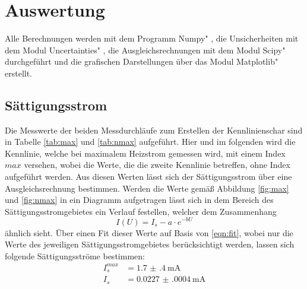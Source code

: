 \section{Auswertung}
\label{sec:Auswertung}
Alle Berechnungen werden mit dem Programm \glqq Numpy" \cite{numpy}, die Unsicherheiten mit dem Modul \glqq Uncertainties" \cite{uncertainties}, die Ausgleichsrechnungen mit dem Modul \glqq Scipy" \cite{scipy} durchgeführt und die grafischen Darstellungen über das Modul \glqq Matplotlib" \cite{matplotlib} erstellt.


\subsection{Sättigungsstrom}
\label{sub:Sättigungsstrom}

Die Messwerte der beiden Messdurchläufe zum Erstellen der Kennlinienschar sind in Tabelle \ref{tab:max} und \ref{tab:nmax} aufgeführt. Hier und im folgenden wird die Kennlinie, welche bei maximalem Heizstrom gemessen wird, mit einem Index $max$ versehen, wobei die Werte, die die zweite Kennlinie betreffen, ohne Index aufgeführt werden. Aus diesen Werten lässt sich der Sättigungsstrom über eine Ausgleichsrechnung bestimmen. Werden die Werte gemäß Abbildung \ref{fig:max} und \ref{fig:nmax} in ein Diagramm aufgetragen lässt sich in dem Bereich des Sättigungsstromgebietes ein Verlauf festellen, welcher dem Zusammenhang
\begin{equation}
    I(U)=I_s-a\cdot e^{-bU}
    \label{eqn:fit}
\end{equation}
ähnlich sieht. Über einen Fit dieser Werte auf Basis von \ref{eqn:fit}, wobei nur die Werte des jeweiligen Sättigungsstromgebietes berücksichtigt werden, lassen sich folgende Sättigungsströme bestimmen:
\begin{align*}
I_s^{max}& = \SI{1.7(4)}{\milli\A}  \\
I_s& = \SI{0.0227(0004)}{\milli\A}
\end{align*}


